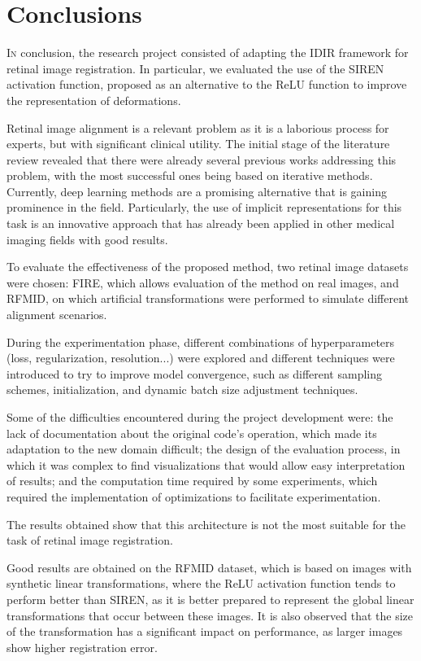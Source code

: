 \chapter{Conclusions}
\label{chap:Conclusións}

\lettrine{I}{n} conclusion, the research project consisted of adapting the IDIR framework for retinal image registration.
In particular, we evaluated the use of the SIREN activation function, proposed as an alternative to the ReLU function to improve the representation of deformations.

Retinal image alignment is a relevant problem as it is a laborious process for experts, but with significant clinical utility.
The initial stage of the literature review revealed that there were already several previous works addressing this problem, with the most successful ones being based on iterative methods.
Currently, deep learning methods are a promising alternative that is gaining prominence in the field. Particularly, the use of implicit representations for this task is an innovative approach that has already been applied in other medical imaging fields with good results.

To evaluate the effectiveness of the proposed method, two retinal image datasets were chosen: FIRE, which allows evaluation of the method on real images, and RFMID, on which artificial transformations were performed to simulate different alignment scenarios.

During the experimentation phase, different combinations of hyperparameters (loss, regularization, resolution...) were explored and different techniques were introduced to try to improve model convergence, such as different sampling schemes, initialization, and dynamic batch size adjustment techniques.

Some of the difficulties encountered during the project development were: the lack of documentation about the original code's operation, which made its adaptation to the new domain difficult; the design of the evaluation process, in which it was complex to find visualizations that would allow easy interpretation of results; and the computation time required by some experiments, which required the implementation of optimizations to facilitate experimentation.

The results obtained show that this architecture is not the most suitable for the task of retinal image registration.

Good results are obtained on the RFMID dataset, which is based on images with synthetic linear transformations, where the ReLU activation function tends to perform better than SIREN, as it is better prepared to represent the global linear transformations that occur between these images.
It is also observed that the size of the transformation has a significant impact on performance, as larger images show higher registration error.


